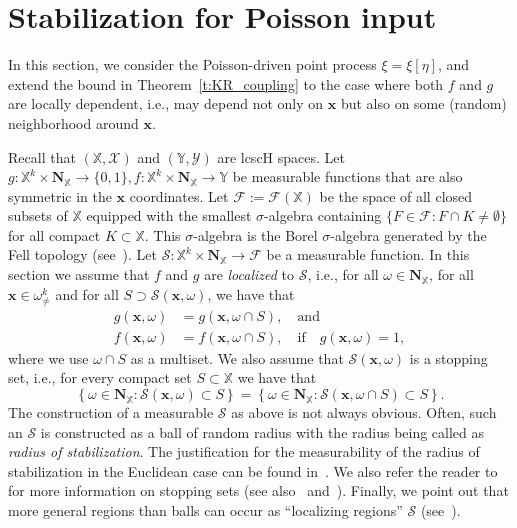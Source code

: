 \documentclass[AHL,Unicode,longabstracts]{cedram}
\newcommand*\bN{\mathbf{N}}
\newcommand{\bx}{\mathbf{x}}
\newcommand*\X{\mathbb{X}}
\newcommand*\Y{\mathbb{Y}}
\newcommand*\cF{\mathcal{F}}
\newcommand*\cS{\mathcal{S}}
\newcommand*\cX{\mathcal{X}}
\newcommand*\cY{\mathcal{Y}}
\newcommand{\set}[1]{\left\{#1\right\}}
\begin{document}
\section{Stabilization for Poisson input}\label{s:locdep}

In this section, we consider the Poisson-driven point process $\xi = \xi[\eta]$, and extend the bound in Theorem~\ref{t:KR_coupling} to the case where both $f$ and $g$ are locally dependent, i.e., may depend not only on $\bx$ but also on some (random) neighborhood around $\bx$.

Recall that $(\X,\cX)$ and $(\Y,\cY)$ are lcscH spaces. Let $g : \X^k \times \bN_{\X} \to \{0,1\}, f : \X^k \times \bN_{\X} \to \Y$ be measurable functions that are also symmetric in the $\bx$ coordinates. Let $\cF := \cF(\X)$ be the space of all closed subsets of $\X$ equipped with the smallest $\sigma$-algebra containing $\{F \in \cF : F \cap K \neq \emptyset\}$ for all compact $K \subset \X$. This $\sigma$-algebra is the Borel $\sigma$-algebra generated by the Fell topology (see~\cite[Chapter~9]{Baccelli2020}). Let $\cS : \X^{k} \times \bN_{\X} \to \cF$ be a measurable function. In this section we assume that $f$ and $g$ are \emph{localized} to $\cS$, i.e., for all $\omega \in \bN_{\X}$, for all $\bx \in \omega^k_{\ne}$ and for all $S \supset \cS(\bx,\omega)$, we have that
\begin{equation}\label{e:AssumptionRi}
\begin{split}
g(\bx,\omega)&=g(\bx,\omega \cap S),\quad\text{and} \\
f(\bx,\omega)&=f(\bx,\omega\cap S), \quad \text{if} \quad g(\bx,\omega)=1,
\end{split}
\end{equation}
where we use $\omega \cap S$ as a multiset. We also assume that $\cS({\bx},\omega)$ is a stopping set, i.e., for every compact set $S\subset \X$ we have that
\begin{equation}\label{e:stoppingset}
\set{\omega \in \bN_{\X} : \cS({\bx},\omega)\subset S} = \set{ \omega \in \bN_{\X} : \cS(\bx, \omega \cap S) \subset S}.
\end{equation}
The construction of a measurable $\cS$ as above is not always obvious. Often, such an $\cS$ is {constructed as a ball of random radius with the radius being called as {\em radius of stabilization}}. The justification for the measurability of the radius of stabilization {in the Euclidean case} can be found in~\cite[Definition~2.1 and below]{penrose_lln_2007}. We also refer the reader to~\cite[Section~2]{Otto2020} for more information on stopping sets (see also~\cite[Appendix A]{BaumstarkLast09} and~\cite[Appendix A]{Last2021}). Finally, we point out that more general regions than balls can occur as ``localizing regions'' $\cS$ (see~\cite{Bhattacharjee2021}). 
\end{document}
